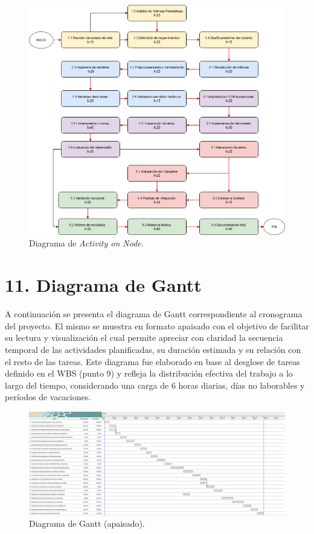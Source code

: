 \documentclass[
11pt, %
]{charter}
\begin{document}
\begin{figure}[htpb]
\centering 
\includegraphics[width=1\textwidth]{./Figuras/AoN.png}
\caption{Diagrama de \textit{Activity on Node}.}
\label{fig:AoN}
\end{figure}



\section{11. Diagrama de Gantt}
\label{sec:gantt}
A continuación se presenta el diagrama de Gantt correspondiente al cronograma del proyecto. El mismo se muestra en formato apaisado con el objetivo de facilitar su lectura y visualización el cual permite apreciar con claridad la secuencia temporal de las actividades planificadas, su duración estimada y su relación con el resto de las tareas. Este diagrama fue elaborado en base al desglose de tareas definido en el WBS (punto 9) y refleja la distribución efectiva del trabajo a lo largo del tiempo, considerando una carga de 6 horas diarias, días no laborables y períodos de vacaciones. 
\begin{landscape}
\begin{figure}[H]
\centering
\includegraphics[width=\linewidth,keepaspectratio]{./Figuras/Gantt-2.png}
\caption{Diagrama de Gantt (apaisado).}
\label{fig:diagGantt}

\end{figure}
\end{landscape}
\end{document}
